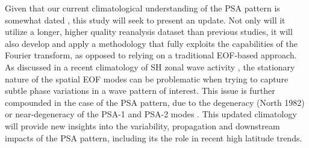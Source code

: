 Given that our current climatological understanding of the PSA pattern is somewhat dated \citep{Mo1998,Mo2001}, this study will seek to present an update. Not only will it utilize a longer, higher quality reanalysis dataset than previous studies, it will also develop and apply a methodology that fully exploits the capabilities of the Fourier transform, as opposed to relying on a traditional EOF-based approach. As discussed in a recent climatology of SH zonal wave activity \citep{Irving2015}, the stationary nature of the spatial EOF modes can be problematic when trying to capture subtle phase variations in a wave pattern of interest. This issue is further compounded in the case of the PSA pattern, due to the degeneracy (North 1982) or near-degeneracy of the PSA-1 and PSA-2 modes \citep[e.g.][]{Mo2000}. This updated climatology will provide new insights into the variability, propagation and downstream impacts of the PSA pattern, including its the role in recent high latitude trends. 

